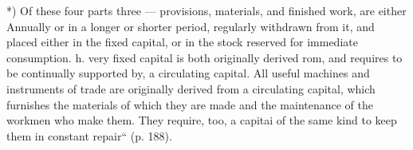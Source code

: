 *) Of these four parts three — provisions, materials, and finished work, are either
Annually or in a longer or shorter period, regularly withdrawn from it, and placed
either in the fixed capital, or in the stock reserved for immediate consumption.
h. very fixed capital is both originally derived rom, and requires to be continually
supported by, a circulating capital. All useful machines and instruments of trade are
originally derived from a circulating capital, which furnishes the materials of which
they are made and the maintenance of the workmen who make them. They require,
too, a capitai of the same kind to keep them in constant repair“ (p. 188).
